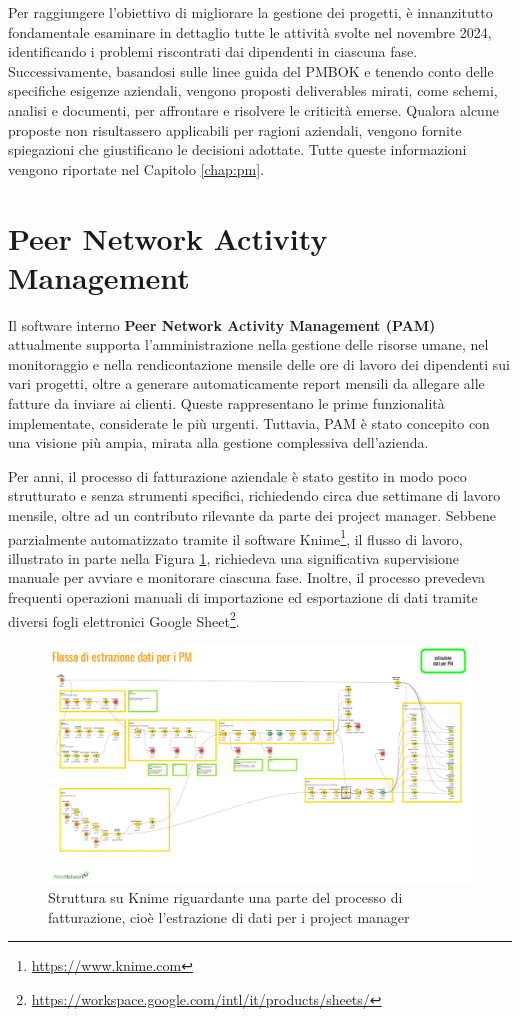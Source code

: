 Per raggiungere l'obiettivo di migliorare la gestione dei progetti, è innanzitutto fondamentale esaminare in dettaglio tutte le attività svolte nel novembre 2024,
identificando i problemi riscontrati dai dipendenti in ciascuna fase. Successivamente, basandosi sulle linee guida del \ac{PMBOK} e tenendo conto delle specifiche
esigenze aziendali, vengono proposti deliverables mirati, come schemi, analisi e documenti, per affrontare e risolvere le criticità emerse. Qualora alcune proposte
non risultassero applicabili per ragioni aziendali, vengono fornite spiegazioni che giustificano le decisioni adottate. Tutte queste informazioni vengono riportate
nel Capitolo \ref{chap:pm}.

\section{Peer Network Activity Management}
Il software interno \textbf{Peer Network Activity Management (PAM)} attualmente supporta l’amministrazione nella gestione delle risorse umane, nel monitoraggio e nella rendicontazione mensile
delle ore di lavoro dei dipendenti sui vari progetti, oltre a generare automaticamente report mensili da allegare alle fatture da inviare ai clienti.
Queste rappresentano le prime funzionalità implementate, considerate le più urgenti. Tuttavia, \ac{PAM} è stato concepito con una visione più ampia, mirata
alla gestione complessiva dell'azienda.

Per anni, il processo di fatturazione aziendale è stato gestito in modo poco strutturato e senza strumenti specifici, richiedendo circa due settimane
di lavoro mensile, oltre ad un contributo rilevante da parte dei project manager. Sebbene parzialmente automatizzato tramite il software Knime\footnote{\url{https://www.knime.com}},
il flusso di lavoro, illustrato in parte nella Figura \ref{fig:fatturazione-knime}, richiedeva una significativa supervisione manuale per avviare e monitorare ciascuna fase.
Inoltre, il processo prevedeva frequenti operazioni manuali di importazione ed esportazione di dati tramite diversi fogli elettronici Google
Sheet\footnote{\url{https://workspace.google.com/intl/it/products/sheets/}}.

\begin{figure}
    \centering
    \includegraphics[width=\linewidth]{figures/FatturazioneKnime.pdf}
    \caption{Struttura su Knime riguardante una parte del processo di fatturazione, cioè l’estrazione di dati per i project manager}
    \label{fig:fatturazione-knime}
\end{figure}

